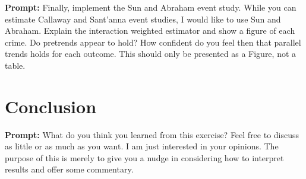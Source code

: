 \documentclass{article}
\begin{document}
\textbf{Prompt: } Finally, implement the Sun and Abraham event study.  While you can estimate Callaway and Sant’anna event studies, I would like to use Sun and Abraham.  Explain the interaction weighted estimator and show a figure of each crime.  Do pretrends appear to hold?  How confident do you feel then that parallel trends holds for each outcome.  This should only be presented as a Figure, not a table.  

\section{Conclusion}

\textbf{Prompt: }What do you think you learned from this exercise?  Feel free to discuss as little or as much as you want.  I am just interested in your opinions.  The purpose of this is merely to give you a nudge in considering how to interpret results and offer some commentary. 
\end{document}
